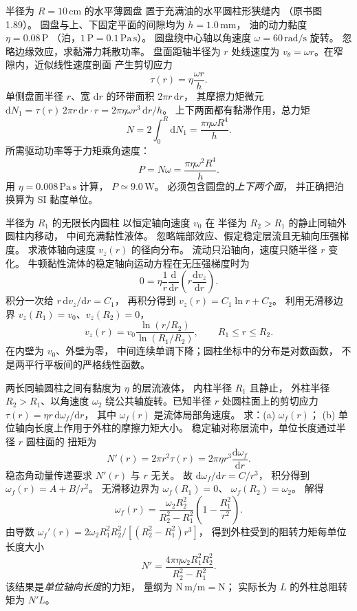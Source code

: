 半径为 $R=10\,\mathrm{cm}$ 的水平薄圆盘
置于充满油的水平圆柱形狭缝内
（原书图1.89）。
圆盘与上、下固定平面的间隙均为
$h=1.0\,\mathrm{mm}$，
油的动力黏度
$\eta=0.08\,\mathrm{P}$
（泊，$1\,\mathrm P=0.1\,\mathrm{Pa\,s}$）。
圆盘绕中心轴以角速度
$\omega=60\,\mathrm{rad/s}$ 旋转。
忽略边缘效应，求黏滞力耗散功率。
\exsolution
盘面距轴半径为 $r$ 处线速度为
$v_\theta=\omega r$。在窄隙内，近似线性速度剖面
产生剪切应力
\[
\tau(r)=\eta\frac{\omega r}{h}.
\]
单侧盘面半径 $r$、宽 $\mathrm dr$ 的环带面积
$2\pi r\,\mathrm dr$，
其摩擦力矩微元
$\mathrm dN_1=\tau(r)\,2\pi r\,\mathrm dr\cdot r
=2\pi\eta\omega r^3\,\mathrm dr/h$。
上下两面都有黏滞作用，总力矩
\[
N=2\int_0^R\mathrm dN_1
=\frac{\pi\eta\omega R^4}{h}.
\]
所需驱动功率等于力矩乘角速度：
\[
\boxed{P=N\omega=\frac{\pi\eta\omega^2R^4}{h}}.
\]
用 $\eta=0.008\,\mathrm{Pa\,s}$ 计算，
$\boxed{P\simeq9.0\,\mathrm W}$。
\excheck 必须包含圆盘的\emph{上下两个面}，
并正确把泊换算为 SI 黏度单位。

半径为 $R_1$ 的无限长内圆柱
以恒定轴向速度 $v_0$ 在
半径为 $R_2>R_1$ 的静止同轴外圆柱内移动，
中间充满黏性液体。
忽略端部效应、假定稳定层流且无轴向压强梯度。
求液体轴向速度 $v_z(r)$ 的径向分布。
\exsolution
流动只沿轴向，速度只随半径 $r$ 变化。
牛顿黏性流体的稳定轴向运动方程在无压强梯度时为
\[
0=\eta\frac1r\frac{\mathrm d}{\mathrm dr}
\left(r\frac{\mathrm dv_z}{\mathrm dr}\right).
\]
积分一次给 $r\,\mathrm dv_z/\mathrm dr=C_1$，
再积分得到
$v_z(r)=C_1\ln r+C_2$。
利用无滑移边界
$v_z(R_1)=v_0$、$v_z(R_2)=0$，
\[
\boxed{v_z(r)=v_0
\frac{\ln(r/R_2)}{\ln(R_1/R_2)}},
\qquad R_1\le r\le R_2.
\]
\excheck 在内壁为 $v_0$、外壁为零，
中间连续单调下降；圆柱坐标中的分布是对数函数，
不是两平行平板间的严格线性函数。

两长同轴圆柱之间有黏度为 $\eta$ 的层流液体，
内柱半径 $R_1$ 且静止，
外柱半径 $R_2>R_1$、以角速度 $\omega_2$
绕公共轴旋转。已知半径 $r$ 处圆柱面上的剪切应力
$\tau(r)=\eta r\,\mathrm d\omega_f/\mathrm dr$，
其中 $\omega_f(r)$ 是流体局部角速度。
求：(a) $\omega_f(r)$；
(b) 单位轴向长度上作用于外柱的摩擦力矩大小。
\exsolution
稳定轴对称层流中，单位长度通过半径 $r$ 圆柱面的
扭矩为
\[
N'(r)=2\pi r^2\tau(r)
=2\pi\eta r^3\frac{\mathrm d\omega_f}{\mathrm dr}.
\]
稳态角动量传递要求 $N'(r)$ 与 $r$ 无关。
故 $\mathrm d\omega_f/\mathrm dr=C/r^3$，
积分得到
$\omega_f(r)=A+B/r^2$。
无滑移边界为
$\omega_f(R_1)=0$、
$\omega_f(R_2)=\omega_2$。
解得
\[
\boxed{\omega_f(r)=
\frac{\omega_2R_2^2}{R_2^2-R_1^2}
\left(1-\frac{R_1^2}{r^2}\right)}.
\]
由导数
$\omega_f'(r)=
2\omega_2R_1^2R_2^2/
[(R_2^2-R_1^2)r^3]$，
得到外柱受到的阻转力矩每单位长度大小
\[
\boxed{N'=
\frac{4\pi\eta\omega_2 R_1^2R_2^2}
{R_2^2-R_1^2}}.
\]
\excheck 该结果是\emph{单位轴向长度}的力矩，
量纲为 $\mathrm{N\,m/m}=\mathrm N$；
实际长为 $L$ 的外柱总阻转矩为 $N'L$。

